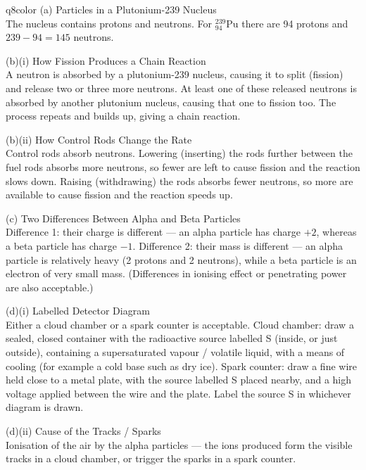 \documentclass[11pt,a4paper]{article}
\begin{document}
\begin{ansbox}{q8color}
(a) Particles in a Plutonium-239 Nucleus\\[4pt]
The nucleus contains protons and neutrons. For $^{239}_{94}\text{Pu}$ there are 94 protons and $239 - 94 = 145$ neutrons.

\vspace{4pt}
(b)(i) How Fission Produces a Chain Reaction\\[4pt]
A neutron is absorbed by a plutonium-239 nucleus, causing it to split (fission) and release two or three more neutrons. At least one of these released neutrons is absorbed by another plutonium nucleus, causing that one to fission too. The process repeats and builds up, giving a chain reaction.

\vspace{4pt}
(b)(ii) How Control Rods Change the Rate\\[4pt]
Control rods absorb neutrons. Lowering (inserting) the rods further between the fuel rods absorbs more neutrons, so fewer are left to cause fission and the reaction slows down. Raising (withdrawing) the rods absorbs fewer neutrons, so more are available to cause fission and the reaction speeds up.

\vspace{4pt}
(c) Two Differences Between Alpha and Beta Particles\\[4pt]
Difference 1: their charge is different --- an alpha particle has charge $+2$, whereas a beta particle has charge $-1$. Difference 2: their mass is different --- an alpha particle is relatively heavy (2 protons and 2 neutrons), while a beta particle is an electron of very small mass. (Differences in ionising effect or penetrating power are also acceptable.)

\vspace{4pt}
(d)(i) Labelled Detector Diagram\\[4pt]
Either a cloud chamber or a spark counter is acceptable. Cloud chamber: draw a sealed, closed container with the radioactive source labelled S (inside, or just outside), containing a supersaturated vapour / volatile liquid, with a means of cooling (for example a cold base such as dry ice). Spark counter: draw a fine wire held close to a metal plate, with the source labelled S placed nearby, and a high voltage applied between the wire and the plate. Label the source S in whichever diagram is drawn.

\vspace{4pt}
(d)(ii) Cause of the Tracks / Sparks\\[4pt]
Ionisation of the air by the alpha particles --- the ions produced form the visible tracks in a cloud chamber, or trigger the sparks in a spark counter.
\end{ansbox}
\end{document}
